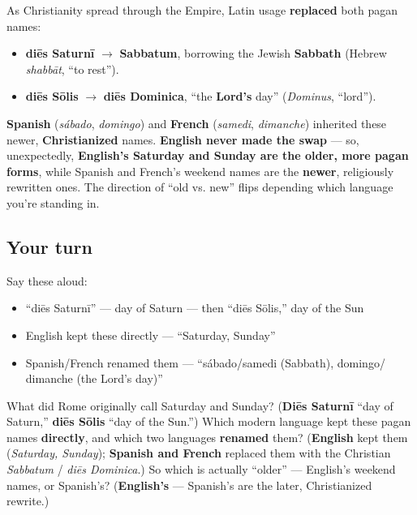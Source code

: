 \begin{culture}
As Christianity spread through the Empire, Latin usage \textbf{replaced} both pagan names:

\begin{itemize}
\raggedright
  \item \textbf{diēs Saturnī} $\to$ \textbf{Sabbatum}, borrowing the Jewish \textbf{Sabbath} (Hebrew \emph{shabbāt}, \textquotedblleft{}to rest\textquotedblright{}).
  \item \textbf{diēs Sōlis} $\to$ \textbf{diēs Dominica}, \textquotedblleft{}the \textbf{Lord's} day\textquotedblright{} (\emph{Dominus}, \textquotedblleft{}lord\textquotedblright{}).
\end{itemize}

\textbf{Spanish} (\emph{sábado}, \emph{domingo}) and \textbf{French} (\emph{samedi}, \emph{dimanche}) inherited these newer, \textbf{Christianized} names. \textbf{English never made the swap} — so, unexpectedly, \textbf{English's Saturday and Sunday are the older, more pagan forms}, while Spanish and French's weekend names are the \textbf{newer}, religiously rewritten ones. The direction of \textquotedblleft{}old vs. new\textquotedblright{} flips depending which language you're standing in.
\end{culture}

\subsection*{Your turn}
Say these aloud:

\begin{itemize}
\raggedright
  \item \textquotedblleft{}diēs Saturnī\textquotedblright{} — day of Saturn — then \textquotedblleft{}diēs Sōlis,\textquotedblright{} day of the Sun
  \item English kept these directly — \textquotedblleft{}Saturday, Sunday\textquotedblright{}
  \item Spanish/French renamed them — \textquotedblleft{}sábado/samedi (Sabbath), domingo/ dimanche (the Lord's day)\textquotedblright{}
\end{itemize}

\begin{tcolorbox}[breakable,colback=teal!4,colframe=teal!35!black,title={Before you move on}]
What did Rome originally call Saturday and Sunday? (\textbf{Diēs Saturnī} \textquotedblleft{}day of Saturn,\textquotedblright{} \textbf{diēs Sōlis} \textquotedblleft{}day of the Sun.\textquotedblright{}) Which modern language kept these pagan names \textbf{directly}, and which two languages \textbf{renamed} them? (\textbf{English} kept them (\emph{Saturday, Sunday}); \textbf{Spanish and French} replaced them with the Christian \emph{Sabbatum} / \emph{diēs Dominica}.) So which is actually \textquotedblleft{}older\textquotedblright{} — English's weekend names, or Spanish's? (\textbf{English's} — Spanish's are the later, Christianized rewrite.)
\end{tcolorbox}
